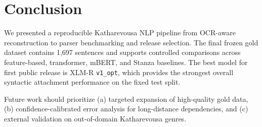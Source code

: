 \section{Conclusion}

We presented a reproducible Katharevousa NLP pipeline from OCR-aware reconstruction to parser benchmarking and release selection. The final frozen gold dataset contains 1,697 sentences and supports controlled comparisons across feature-based, transformer, mBERT, and Stanza baselines. The best model for first public release is XLM-R \texttt{v1\_opt}, which provides the strongest overall syntactic attachment performance on the fixed test split.

Future work should prioritize (a) targeted expansion of high-quality gold data, (b) confidence-calibrated error analysis for long-distance dependencies, and (c) external validation on out-of-domain Katharevousa genres.
